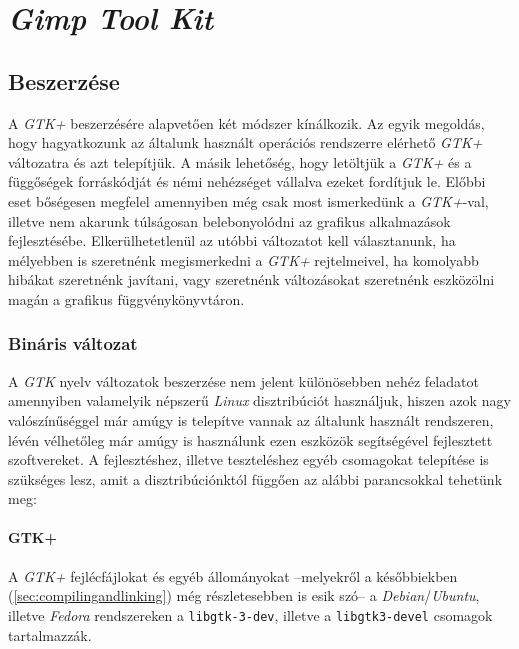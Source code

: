 \section{\textit{Gimp Tool Kit}}

\subsection{Beszerzése}

A \textit{GTK+} beszerzésére alapvetően két módszer kínálkozik. Az egyik megoldás, hogy hagyatkozunk az általunk használt operációs rendszerre elérhető \textit{GTK+} változatra és azt telepítjük. A másik lehetőség, hogy letöltjük a \textit{GTK+} és a függőségek forráskódját és némi nehézséget vállalva ezeket fordítjuk le. Előbbi eset bőségesen megfelel amennyiben még csak most ismerkedünk a \textit{GTK+}-val, illetve nem akarunk túlságosan belebonyolódni az grafikus alkalmazások fejlesztésébe. Elkerülhetetlenül az utóbbi változatot kell választanunk, ha mélyebben is szeretnénk megismerkedni a \textit{GTK+} rejtelmeivel, ha komolyabb hibákat szeretnénk javítani, vagy szeretnénk változásokat szeretnénk eszközölni magán a grafikus függvénykönyvtáron.

\subsubsection{Bináris változat}

A \textit{GTK} nyelv változatok beszerzése nem jelent különösebben nehéz feladatot amennyiben valamelyik népszerű \textit{Linux} disztribúciót használjuk, hiszen azok nagy valószínűséggel már amúgy is telepítve vannak az általunk használt rendszeren, lévén vélhetőleg már amúgy is használunk ezen eszközök segítségével fejlesztett szoftvereket. A fejlesztéshez, illetve teszteléshez egyéb csomagokat telepítése is szükséges lesz, amit a disztribúciónktól függően az alábbi parancsokkal tehetünk meg:


\paragraph{GTK+}

A \textit{GTK+} fejlécfájlokat és egyéb állományokat --melyekről a későbbiekben (\ref{sec:compilingandlinking}) még részletesebben is esik szó-- a \textit{Debian}/\textit{Ubuntu}, illetve \textit{Fedora} rendszereken a \texttt{libgtk-3-dev}, illetve a \texttt{libgtk3-devel} csomagok tartalmazzák.

